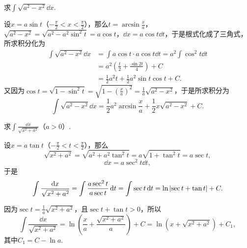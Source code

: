 \begin{example}
求\(\int \sqrt{a^2 - x^2} \dd{x}\).
\begin{solution}
设\(x = a \sin t\)（\(-\frac{\pi}{2} < x < \frac{\pi}{2}\)），那么\(t = \arcsin\frac{x}{a}\)，\(\sqrt{a^2 - x^2} = \sqrt{a^2 - a^2 \sin^2 t} = a \cos t\)，\(\dd{x} = a \cos t \dd{t}\)，于是根式化成了三角式，所求积分化为\begin{align*}
\int \sqrt{a^2 - x^2} \dd{x}
&= \int a \cos t \cdot a \cos t \dd{t}
= a^2 \int \cos^2 t \dd{t} \\
&= a^2 \left( \frac{t}{2} + \frac{\sin 2t}{4} \right) + C \\
&= \frac{1}{2} a^2 t + \frac{1}{2} a^2 \sin t \cos t + C.
\end{align*}又因为\(\cos t = \sqrt{1 - \sin^2 t} = \sqrt{1 - \left(\frac{x}{a}\right)^2} = \frac{1}{a} \sqrt{a^2 - x^2}\)，于是所求积分为\[
\int \sqrt{a^2 - x^2} \dd{x}
= \frac{1}{2} a^2 \arcsin\frac{x}{a} + \frac{1}{2} x \sqrt{a^2 - x^2} + C.
\]
\end{solution}
\end{example}

\begin{example}
求\(\int \frac{\dd{x}}{\sqrt{x^2 + a^2}}\)（\(a>0\)）.
\begin{solution}
设\(x = a \tan t\)（\(-\frac{\pi}{2} < t < \frac{\pi}{2}\)），那么\[
\sqrt{x^2 + a^2}
= \sqrt{a^2 + a^2 \tan^2 t}
= a \sqrt{1 + \tan^2 t}
= a \sec t,
\]\[
\dd{x} = a \sec^2 t \dd{t},
\]于是\[
\int \frac{\dd{x}}{\sqrt{x^2 + a^2}}
= \int \frac{a \sec^2 t}{a \sec t} \dd{t}
= \int \sec t \dd{t}
= \ln\abs{\sec t + \tan t} + C.
\]

因为\(\sec t = \frac{1}{a} \sqrt{x^2 + a^2}\)，且\(\sec t + \tan t > 0\)，所以\[
\int \frac{\dd{x}}{\sqrt{x^2 + a^2}}
= \ln( \frac{x}{a} + \frac{\sqrt{x^2 + a^2}}{a} ) + C
= \ln(x + \sqrt{x^2 + a^2}) + C_1,
\]其中\(C_1 = C - \ln a\).
\end{solution}
\end{example}

